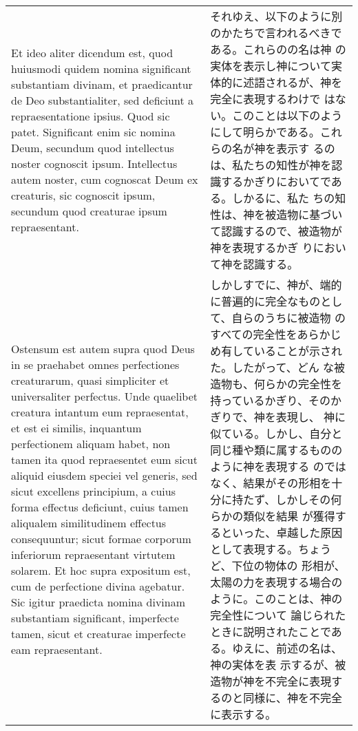 \documentclass[10pt]{jsarticle}
\begin{document}
\begin{longtable}{p{21em}p{21em}}
\\

Et ideo aliter dicendum est, quod huiusmodi quidem nomina significant
substantiam divinam, et praedicantur de Deo substantialiter, sed
deficiunt a repraesentatione ipsius. Quod sic patet. Significant enim
sic nomina Deum, secundum quod intellectus noster cognoscit
ipsum. Intellectus autem noster, cum cognoscat Deum ex creaturis, sic
cognoscit ipsum, secundum quod creaturae ipsum repraesentant.

&

それゆえ、以下のように別のかたちで言われるべきである。これらのの名は神
の実体を表示し神について実体的に述語されるが、神を完全に表現するわけで
はない。このことは以下のようにして明らかである。これらの名が神を表示す
るのは、私たちの知性が神を認識するかぎりにおいてである。しかるに、私た
ちの知性は、神を被造物に基づいて認識するので、被造物が神を表現するかぎ
りにおいて神を認識する。

\\

Ostensum est autem supra quod Deus in se praehabet omnes perfectiones
creaturarum, quasi simpliciter et universaliter perfectus. Unde
quaelibet creatura intantum eum repraesentat, et est ei similis,
inquantum perfectionem aliquam habet, non tamen ita quod repraesentet
eum sicut aliquid eiusdem speciei vel generis, sed sicut excellens
principium, a cuius forma effectus deficiunt, cuius tamen aliqualem
similitudinem effectus consequuntur; sicut formae corporum inferiorum
repraesentant virtutem solarem. Et hoc supra expositum est, cum de
perfectione divina agebatur. Sic igitur praedicta nomina divinam
substantiam significant, imperfecte tamen, sicut et creaturae
imperfecte eam repraesentant.

&

しかしすでに、神が、端的に普遍的に完全なものとして、自らのうちに被造物
のすべての完全性をあらかじめ有していることが示された。したがって、どん
な被造物も、何らかの完全性を持っているかぎり、そのかぎりで、神を表現し、
神に似ている。しかし、自分と同じ種や類に属するもののように神を表現する
のではなく、結果がその形相を十分に持たず、しかしその何らかの類似を結果
が獲得するといった、卓越した原因として表現する。ちょうど、下位の物体の
形相が、太陽の力を表現する場合のように。このことは、神の完全性について
論じられたときに説明されたことである。ゆえに、前述の名は、神の実体を表
示するが、被造物が神を不完全に表現するのと同様に、神を不完全に表示する。

\\


\end{longtable}
\end{document}
